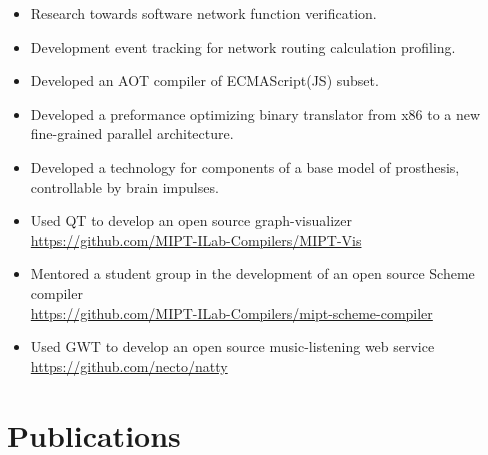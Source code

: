 \documentclass[letterpaper]{resume}
\begin{document}
\begin{itemize}
  \item Research towards software network function verification.
\end{itemize}
\begin{itemize}
  \item Development event tracking for network routing calculation profiling.
\end{itemize}
\begin{itemize}
  \item Developed an AOT compiler of ECMAScript(JS) subset.
\end{itemize}
\begin{itemize}
  \item Developed a preformance optimizing binary translator from x86 to a new fine-grained parallel architecture.
\end{itemize}
\begin{itemize}
  \item Developed a technology for components of a base model of prosthesis, controllable by brain impulses.
\end{itemize}
\begin{itemize}
    \item Used QT to develop an open source graph-visualizer\\ \url{https://github.com/MIPT-ILab-Compilers/MIPT-Vis}
    \item Mentored a student group in the development of an open source Scheme compiler\\ \url{https://github.com/MIPT-ILab-Compilers/mipt-scheme-compiler}
\end{itemize}
\begin{itemize}
    \item Used GWT to develop an open source music-listening web service \\\url{https://github.com/necto/natty}
\end{itemize}

\section{Publications}
\end{document}
